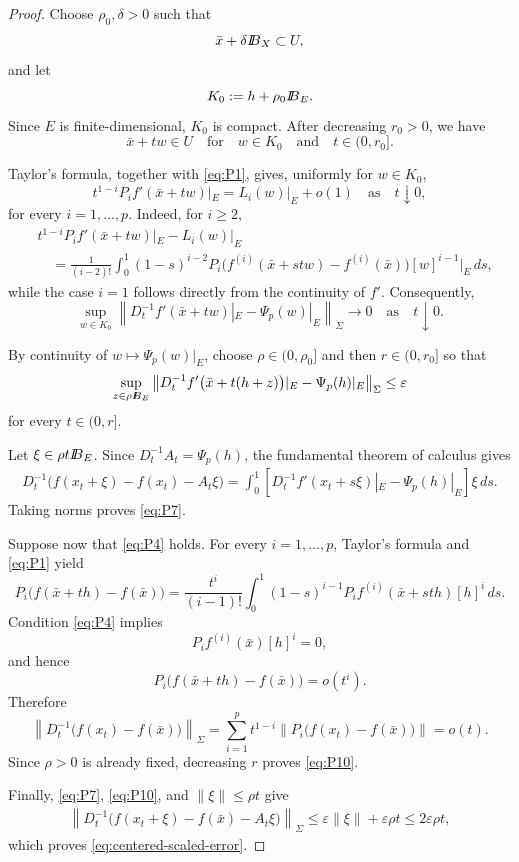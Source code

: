 \documentclass[11pt]{amsart}
\theoremstyle{definition}
\theoremstyle{remark}
\newcommand{\bx}{\bar x}
\def\ball{{I\kern -.35em B}}
\begin{document}
	\begin{proof}
		Choose $\rho_0,\delta>0$ such that
		$$
		\bx+\delta\ball_X\subset U,
		$$
		and let
		$$
		K_0:=h+\rho_0\ball_E.
		$$
		Since $E$ is finite-dimensional, $K_0$ is compact. After decreasing
		$r_0>0$, we have
		$$
		\bx+tw\in U
		\quad\text{for}\quad
		w\in K_0 \quad\text{and}\quad t\in(0, r_0].
		$$
		
		Taylor's formula, together with \eqref{eq:P1}, gives, uniformly for
		$w\in K_0$,
		$$
		t^{1-i}P_i f'(\bx+tw)|_E
		=
		L_i(w)|_E+o(1)
		\quad\text{as}\quad t\downarrow0,
		$$
		for every $i=1,\ldots,p$. Indeed, for $i\ge2$,
		$$
		\begin{aligned}
			&t^{1-i}P_i f'(\bx+tw)|_E-L_i(w)|_E\\
			&\quad=
			\frac{1}{(i-2)!}
			\int_0^1(1-s)^{i-2}
			P_i\bigl(f^{(i)}(\bx+stw)-f^{(i)}(\bx)\bigr)
			[w]^{i-1}|_E\,ds,
		\end{aligned}
		$$
		while the case $i=1$ follows directly from the continuity of $f'$.
		Consequently,
		$$
		\sup_{w\in K_0}
		\left\|
		D_t^{-1}f'(\bx+tw)|_E-\Psi_p(w)|_E
		\right\|_\Sigma
		\longrightarrow0
		\quad\text{as}\quad  t\downarrow0.
		$$
		
		By continuity of $w\mapsto\Psi_p(w)|_E$, choose
		$\rho\in(0,\rho_0]$ and then $r\in(0,r_0]$ so that
		$$
		\sup_{z\in\rho\ball_E}
		\left\|
		D_t^{-1}f'\bigl(\bx+t(h+z)\bigr)|_E
		-\Psi_p(h)|_E
		\right\|_\Sigma
		\le\varepsilon
		$$
		for every $t\in(0,r]$.
		
		Let $\xi\in\rho t\ball_E$. Since
		$D_t^{-1}A_t=\Psi_p(h)$, the fundamental theorem of calculus gives
		$$
		\begin{aligned}
			D_t^{-1}
			\bigl(f(x_t+\xi)-f(x_t)-A_t\xi\bigr)
			=
			\int_0^1
			\left[
			D_t^{-1}f'(x_t+s\xi)|_E-\Psi_p(h)|_E
			\right]\xi\,ds.
		\end{aligned}
		$$
		Taking norms proves \eqref{eq:P7}.
		
		Suppose now that \eqref{eq:P4} holds. For every
		$i=1,\ldots,p$, Taylor's formula and \eqref{eq:P1} yield
		$$
		P_i\bigl(f(\bx+th)-f(\bx)\bigr)
		=
		\frac{t^i}{(i-1)!}
		\int_0^1(1-s)^{i-1}
		P_i f^{(i)}(\bx+sth)[h]^i\,ds.
		$$
		Condition \eqref{eq:P4} implies
		$$
		P_i f^{(i)}(\bx)[h]^i=0,
		$$
		and hence
		$$
		P_i\bigl(f(\bx+th)-f(\bx)\bigr)=o(t^i).
		$$
		Therefore
		\begin{equation}
			\label{eq:p-factor-center-small-o}
			\left\|D_t^{-1}
			\bigl(f(x_t)-f(\bx)\bigr)
			\right\|_\Sigma
			=
			\sum_{i=1}^p
			t^{1-i}
			\left\|P_i\bigl(f(x_t)-f(\bx)\bigr)\right\|
			=o(t).
		\end{equation}
		Since $\rho>0$ is already fixed, decreasing $r$ proves
		\eqref{eq:P10}.
		
		Finally, \eqref{eq:P7}, \eqref{eq:P10}, and
		$\|\xi\|\le\rho t$ give
		$$
		\begin{aligned}
			\left\|D_t^{-1}
			\bigl(f(x_t+\xi)-f(\bx)-A_t\xi\bigr)
			\right\|_\Sigma\le
			\varepsilon\|\xi\|+\varepsilon\rho t
			\le2\varepsilon\rho t,
		\end{aligned}
		$$
		which proves \eqref{eq:centered-scaled-error}.
	\end{proof}
	
\end{document}
